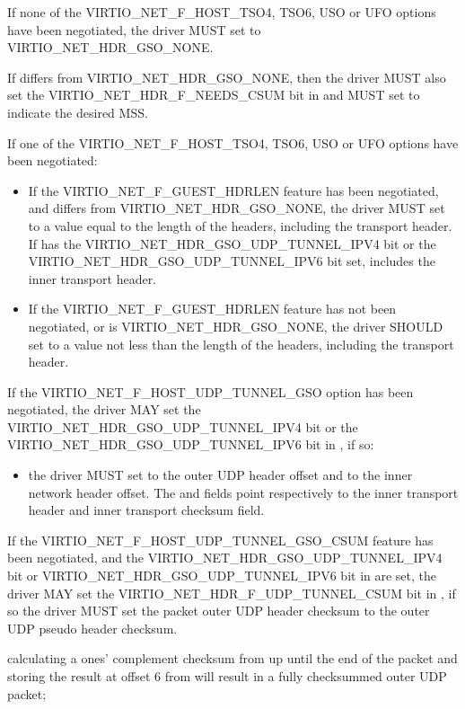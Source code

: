If none of the VIRTIO_NET_F_HOST_TSO4, TSO6, USO or UFO options have
been negotiated, the driver MUST set  to
VIRTIO_NET_HDR_GSO_NONE.

If  differs from VIRTIO_NET_HDR_GSO_NONE, then
the driver MUST also set the VIRTIO_NET_HDR_F_NEEDS_CSUM bit in
 and MUST set  to indicate the
desired MSS.

If one of the VIRTIO_NET_F_HOST_TSO4, TSO6, USO or UFO options have
been negotiated:
\begin{itemize}
\item If the VIRTIO_NET_F_GUEST_HDRLEN feature has been negotiated,
	and  differs from VIRTIO_NET_HDR_GSO_NONE,
	the driver MUST set  to a value equal to the length
	of the headers, including the transport header. If 
	has the VIRTIO_NET_HDR_GSO_UDP_TUNNEL_IPV4 bit or the
	VIRTIO_NET_HDR_GSO_UDP_TUNNEL_IPV6 bit set,  includes
	the inner transport header.

\item If the VIRTIO_NET_F_GUEST_HDRLEN feature has not been negotiated,
	or  is VIRTIO_NET_HDR_GSO_NONE,
	the driver SHOULD set  to a value
	not less than the length of the headers, including the transport
	header.
\end{itemize}

If the VIRTIO_NET_F_HOST_UDP_TUNNEL_GSO option has been negotiated, the
driver MAY set the VIRTIO_NET_HDR_GSO_UDP_TUNNEL_IPV4 bit or the
VIRTIO_NET_HDR_GSO_UDP_TUNNEL_IPV6 bit in , if so:
\begin{itemize}
\item the driver MUST set  to the outer UDP header
  offset and  to the inner network header offset.
  The  and  fields point respectively
  to the inner transport header and inner transport checksum field.
\end{itemize}

If the VIRTIO_NET_F_HOST_UDP_TUNNEL_GSO_CSUM feature has been negotiated,
and the VIRTIO_NET_HDR_GSO_UDP_TUNNEL_IPV4 bit or
VIRTIO_NET_HDR_GSO_UDP_TUNNEL_IPV6 bit in  are set,
the driver MAY set the VIRTIO_NET_HDR_F_UDP_TUNNEL_CSUM bit in
, if so the driver MUST set the packet outer UDP header checksum
to the outer UDP pseudo header checksum.

\begin{note}
calculating a ones' complement checksum from 
up until the end of the packet and storing the result at offset 6
from  will result in a fully checksummed outer UDP packet;
\end{note}

